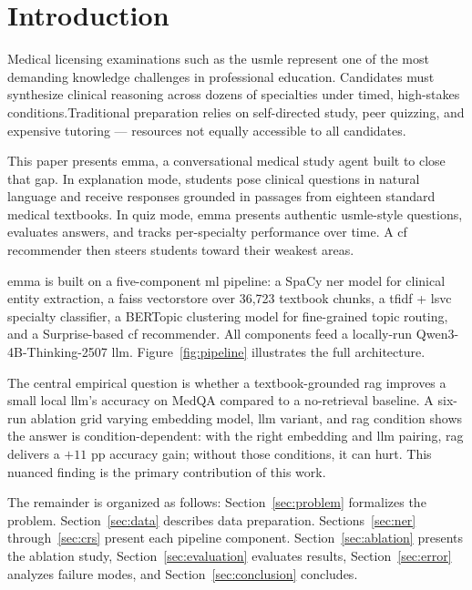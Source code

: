 \section{Introduction}
\label{sec:intro}

Medical licensing examinations such as the \gls{usmle} represent one of the most demanding knowledge challenges in professional education. Candidates must synthesize clinical reasoning across dozens of specialties under timed, high-stakes conditions.Traditional preparation relies on self-directed study, peer quizzing, and expensive tutoring --- resources not equally accessible to all candidates.

This paper presents \gls{emma}, a conversational medical study agent built to close that gap. In explanation mode, students pose clinical questions in natural language and receive responses grounded in passages from eighteen standard medical textbooks. In quiz mode, \gls{emma} presents authentic \gls{usmle}-style questions, evaluates answers, and tracks per-specialty performance over time. A \gls{cf} recommender then steers students toward their weakest areas.

\gls{emma} is built on a five-component \gls{ml} pipeline: a SpaCy \gls{ner} model for clinical entity extraction, a \gls{faiss} vectorstore over 36,723 textbook chunks, a \gls{tfidf} + \gls{lsvc} specialty classifier, a BERTopic clustering model for fine-grained topic routing, and a Surprise-based \gls{cf} recommender. All components feed a locally-run Qwen3-4B-Thinking-2507 \gls{llm}. Figure~\ref{fig:pipeline} illustrates the full architecture.

The central empirical question is whether a textbook-grounded \gls{rag} improves a small local \gls{llm}'s accuracy on MedQA compared to a no-retrieval baseline. A six-run ablation grid varying embedding model, \gls{llm} variant, and \gls{rag} condition shows the answer is condition-dependent: with the right embedding and \gls{llm} pairing, \gls{rag} delivers a $+11$ \gls{pp} accuracy gain; without those conditions, it can hurt. This nuanced finding is the primary contribution of this work.

The remainder is organized as follows: Section~\ref{sec:problem} formalizes the problem. Section~\ref{sec:data} describes data preparation. Sections~\ref{sec:ner} through~\ref{sec:crs} present each pipeline component. Section~\ref{sec:ablation} presents the ablation study, Section~\ref{sec:evaluation} evaluates results, Section~\ref{sec:error} analyzes failure modes, and Section~\ref{sec:conclusion} concludes.

